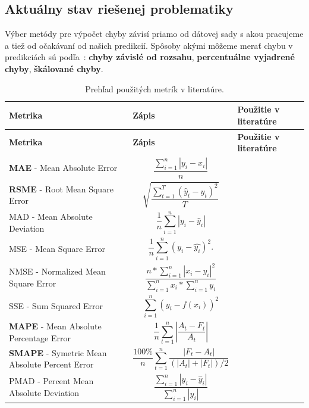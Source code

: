\documentclass[thesismargins, thesislinespacing, openright, upjsfrontpage, combineabstracts]{rnthesis}
\begin{document}
\subsection{Aktuálny stav riešenej problematiky}

Výber metódy pre výpočet chyby závisí priamo od dátovej sady s akou pracujeme a tiež od očakávaní od našich predikcií. Spôsoby akými môžeme merať chybu v predikciách sú podľa~\cite{hyndman2018forecasting}:  \textbf{chyby závislé od rozsahu}, \textbf{percentuálne vyjadrené chyby},  \textbf{škálované chyby}. 

\begin{longtable}[p]{ | p{4cm} | p{5cm} | p{5cm} | }
    \caption{Prehľad použitých metrík v literatúre.}
    \label{tab:c3_metrics}\\
    \toprule
    \hline \textbf{Metrika} & \textbf{Zápis} & \textbf{Použitie v literatúre}\\
    \midrule
    \endfirsthead
    \toprule
    \hline \textbf{Metrika} & \textbf{Zápis} & \textbf{Použitie v literatúre}\\
    \midrule
     \endhead
     \hline \textbf{MAE} - Mean Absolute Error & $${{\frac {\sum _{i=1}^{n}\left|y_{i}-x_{i}\right|}{n}}}$$ & \cite{tang2018disclosure} \\
     \hline \textbf{RSME} - Root Mean Square Error & $${{\sqrt {\frac {\sum _{t=1}^{T}({\hat {y}}_{t}-y_{t})^{2}}{T}}}}$$ & \cite{tang2018disclosure,tang2017big,condon2008analysis} \\
     \hline MAD - Mean Absolute Deviation & $${{\frac {1}{n}}\sum _{i=1}^{n}{\left|{y_{i}-{\hat {y}}_{i}}\right|}}$$ & \cite{fang2019deep} \\
     \hline MSE - Mean Square Error & $${{\frac {1}{n}}\sum _{i=1}^{n}(y_{i}-{\hat {y_{i}}})^{2}.}$$ & \cite{fang2019deep,werner2017time} \\
     \hline NMSE - Normalized Mean Square Error & $$\frac{n*\sum _{i=1}^{n}\left|x_{i} - y_{i}\right|^{2}}{\sum _{i=1}^{n}{x_{i}} * \sum _{i=1}^{n}{y_{i}}}$$ & \cite{zang2019adaptive,madan2018predicting} \\
     \hline SSE - Sum Squared Error & $${\sum _{i=1}^{n}(y_{i}-f(x_{i}))^{2}}$$ & \cite{cortez2012multi} \\
    
     \hline \textbf{MAPE} - Mean Absolute Percentage Error & $${\frac  {1}{n}}\sum _{{t=1}}^{n}\left|{\frac  {A_{t}-F_{t}}{A_{t}}}\right|$$ & \cite{jiang2004detecting,cortez2012multi,fang2019deep,tang2018disclosure,werner2017time} \\
     \hline \textbf{SMAPE} - Symetric Mean Absolute Percent Error & $${\frac {100\%}{n}}\sum _{t=1}^{n}{\frac {\left|F_{t}-A_{t}\right|}{(|A_{t}|+|F_{t}|)/2}}$$ & \cite{roumani2015time,pokhrel2017cybersecurity} \\
     \hline PMAD - Percent Mean Absolute Deviation & $${\frac {\sum _{i=1}^{n}\left|y_{i}-{\hat {y}}_{i}\right|}{\sum _{i=1}^{n}\left|y_{i}\right|}}$$ & \cite{fang2019deep,zhan2015predicting} \\
     

\end{longtable}
\end{document}
